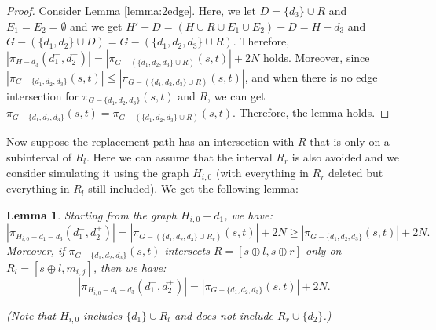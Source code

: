 \documentclass[11pt]{article}
\theoremstyle{plain}
\newtheorem{lemma}[theorem]{Lemma}
\theoremstyle{definition}
\newcommand{\set}[1]{\{ #1 \}}
\newcommand{\og}[3]{\pi_{G-#3}\left(#1,#2\right)}
\newcommand{\hg}[3]{\pi_{H-#3}\left(#1,#2\right)}
\begin{document}
\begin{proof}
    Consider Lemma \ref{lemma:2edge}. Here, we let $D = \set{d_3} \cup R$ and $E_1=E_2=\emptyset$ and we get $H'-D = (H \cup R \cup E_1 \cup E_2)-D = H-d_3$ and $G-(\set{d_1, d_2}\cup D) = G- (\set{d_1, d_2, d_3} \cup R)$. Therefore, $|\hg{d_1^-}{d_2^+}{d_3}| = |\og{s}{t}{(\set{d_1, d_2, d_3} \cup R)}| + 2N$ holds. Moreover, since $|\og{s}{t}{\set{d_1, d_2, d_3}}| \leq |\og{s}{t}{(\set{d_1, d_2, d_3} \cup R)}|$, and when there is no edge intersection for $\og{s}{t}{\set{d_1, d_2, d_3}}$ and $R$, we can get $\og{s}{t}{\set{d_1, d_2, d_3}} = \og{s}{t}{(\set{d_1, d_2, d_3} \cup R)}$. Therefore, the lemma holds.
\end{proof}

Now suppose the replacement path has an intersection with $R$ that is only on a subinterval of $R_l$. Here we can assume that the interval $R_r$ is also avoided and we consider simulating it using the graph $H_{i,0}$ (with everything in $R_r$ deleted but everything in $R_l$ still included). We get the following lemma:

\begin{lemma}\label{2edgecase2}
    Starting from the graph $H_{i,0} - d_1$, we have:
    \[|\pi_{H_{i,0}-d_1-d_3}(d_1^-,d_2^+)| = |\og{s}{t}{(\set{d_1, d_2, d_3}\cup R_r)}| + 2N \geq |\og{s}{t}{\set{d_1, d_2, d_3}}| + 2N.\]
    Moreover, if $\og{s}{t}{\set{d_1, d_2, d_3}}$ intersects $R = [s \oplus l, s \oplus r]$ only on $R_l = [s \oplus l, m_{i,j}]$, then we have:
    \[|\pi_{H_{i,0}-d_1-d_3}(d_1^-,d_2^+)| = |\og{s}{t}{\set{d_1, d_2, d_3}}| + 2N.\]
    
    (Note that $H_{i,0}$ includes $\set{d_1} \cup R_l$ and does not include $R_r \cup \set{d_2}$.)
\end{lemma}
\end{document}
